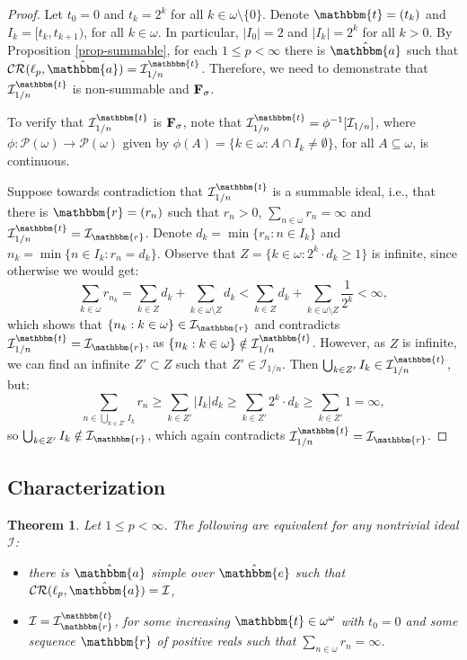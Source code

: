 \documentclass{amsart}
\newcommand{\I}{\mathcal{I}}
\newcommand{\CR}{\mathcal{CR}}
\newcommand{\w}{\mathbbm}
\newtheorem{theorem}{Theorem}[section]
\begin{document}
\begin{proof}
Let $t_0=0$ and $t_k=2^k$ for all $k\in\omega\setminus\{0\}$. Denote $\w{t}=(t_k)$ and $I_k=[t_k,t_{k+1})$, for all $k\in\omega$. In particular, $|I_0|=2$ and $|I_k|=2^k$ for all $k>0$. By Proposition \ref{prop-summable}, for each $1\leq p<\infty$ there is $\hat{\w{a}}$ such that $\CR(\ell_p,\hat{\w{a}})=\I_{1/n}^\w{t}$. Therefore, we need to demonstrate that $\I_{1/n}^\w{t}$ is non-summable and $\bf{F_\sigma}$.

To verify that $\I_{1/n}^\w{t}$ is $\bf{F_\sigma}$, note that $\I_{1/n}^\w{t}=\phi^{-1}[\I_{1/n}]$, where $\phi:\mathcal{P}(\omega)\to \mathcal{P}(\omega)$ given by $\phi(A)=\{k\in\omega: A\cap I_k\neq\emptyset\}$, for all $A\subseteq\omega$, is continuous.

Suppose towards contradiction that $\I_{1/n}^\w{t}$ is a summable ideal, i.e., that there is $\w{r}=(r_n)$ such that $r_n>0$, $\sum_{n\in\omega}r_n=\infty$ and $\I_{1/n}^\w{t}=\I_{\w{r}}$. Denote $d_k=\min\{r_n: n\in I_k\}$ and $n_k=\min\{n\in I_k: r_n=d_k\}$. Observe that $Z=\{k\in\omega: 2^k\cdot d_k\geq 1\}$ is infinite, since otherwise we would get:
\[
\sum_{k\in\omega}r_{n_k}=\sum_{k\in Z}d_k+\sum_{k\in\omega\setminus Z}d_k<\sum_{k\in Z}d_k+\sum_{k\in\omega\setminus Z}\frac{1}{2^k}<\infty,
\]
which shows that $\{n_k:k\in\omega\}\in\I_{\w{r}}$ and contradicts $\I_{1/n}^\w{t}=\I_{\w{r}}$, as $\{n_k:k\in\omega\}\notin\I_{1/n}^\w{t}$. However, as $Z$ is infinite, we can find an infinite $Z'\subset Z$ such that $Z'\in\I_{1/n}$. Then $\bigcup_{k\in Z'}I_k\in \I_{1/n}^\w{t}$, but:
\[
\sum_{n\in \bigcup_{k\in Z'}I_k}r_n\geq \sum_{k\in Z'}|I_k|d_k\geq\sum_{k\in Z'}2^k\cdot d_k\geq \sum_{k\in Z'}1=\infty,
\]
so $\bigcup_{k\in Z'}I_k\notin \I_{\w{r}}$, which again contradicts $\I_{1/n}^\w{t}=\I_{\w{r}}$.
\end{proof}

\subsection{Characterization}

\begin{theorem}
\label{char:lp}
Let $1\leq p<\infty$. The following are equivalent for any nontrivial ideal $\I$:
\begin{itemize}
    \item[(a)] there is $\hat{\w{a}}$ simple over $\hat{\w{e}}$ such that $\CR(\ell_p,\hat{\w{a}})=\I$,
    \item[(b)] $\I=\I^\w{t}_\w{r}$, for some increasing $\w{t}\in\omega^\omega$ with $t_0=0$ and some sequence $\w{r}$ of positive reals such that $\sum_{n\in\omega}r_n=\infty$.
\end{itemize}
\end{theorem}
\end{document}

